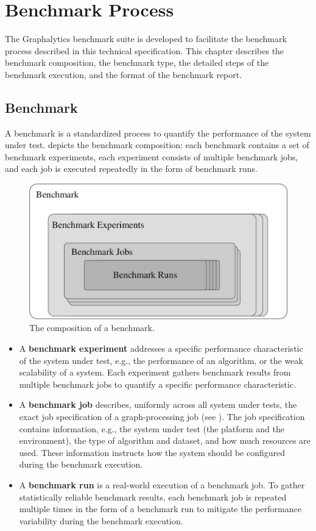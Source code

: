 \chapter{Benchmark Process}
\label{chap:benchmark_process}
The Graphalytics benchmark suite is developed to facilitate the benchmark process described in this technical specification. This chapter describes the benchmark composition, the benchmark type, the detailed steps of the benchmark execution, and the format of the benchmark report. 


\section{Benchmark}
\label{sec:process:benchmark}
A benchmark is a standardized process to quantify the performance of the system under test.  depicts the benchmark composition: each benchmark contains a set of benchmark experiments, each experiment consists of multiple benchmark jobs, and each job is executed repeatedly in the form of benchmark runs.

\begin{figure}[h]
	\centering
	\includegraphics[width=0.6\linewidth]{figures/benchmark-composition.pdf}
	\caption{The composition of a benchmark.}
	\label{fig:benchmark_composition}
\end{figure}

\begin{itemize}
    \item A \textbf{benchmark experiment} addresses a specific performance characteristic of the system under test, e.g., the performance of an algorithm, or the weak scalability of a system. Each experiment gathers benchmark results from multiple benchmark jobs to quantify a specific performance characteristic.
    
    \item A \textbf{benchmark job} describes, uniformly across all system under tests, the exact job specification of a graph-processing job (see ). The job specification contains information, e.g., the system under test (the platform and the environment), the type of algorithm and dataset, and how much resources are used. These information instructs how the system should be configured during the benchmark execution.
    
    \item A \textbf{benchmark run} is a real-world execution of a benchmark job. To gather statistically reliable benchmark results, each benchmark job is repeated multiple times in the form of a benchmark run to mitigate the performance variability during the benchmark execution. 
\end{itemize}




